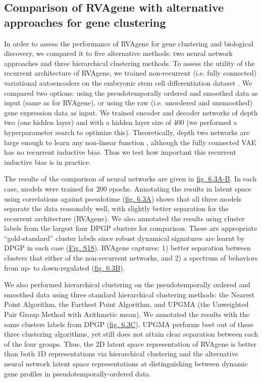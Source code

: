 \subsection{Comparison of RVAgene with alternative approaches for gene clustering}

In order to assess the performance of RVAgene for gene clustering and biological discovery, we compared it to five alternative methods: two neural network approaches and three hierarchical clustering methods. To assess the utility of the recurrent architecture of RVAgene, we trained non-recurrent (i.e. fully connected) variational autoencoders on the embryonic stem cell differentiation dataset \citep{Klein2015}. We compared two options: using the pseudotemporally ordered and smoothed data as input (same as for RVAgene), or using the raw (i.e. unordered and unsmoothed) gene expression data as input. We trained encoder and decoder networks of depth two (one hidden layer) and with a hidden layer size of 400 (we performed a hyperparameter search to optimize this). Theoretically, depth two networks are large enough to learn any non-linear function \citep{cybenko1989approximation, hornik1989multilayer, funahashi1989approximate, barron1994approximation}, although the fully connected VAE has no recurrent inductive bias. Thus we test how important this recurrent inductive bias is in practice. 
\par 
The results of the comparison of neural networks are given in \hyperref[fig:fig4]{fig. 6.3A-B}. In
each case, models were trained for 200 epochs. Annotating the results in latent space using
correlations against pseudotime (\hyperref[fig:fig4]{fig. 6.3A}) shows that all three models
separate the data reasonably well, with slightly better separation for the recurrent architecture
(RVAgene). We also annotated the results using cluster labels from the largest four DPGP clusters
for comparison. These are appropriate ``gold-standard'' cluster labels since robust dynamical
signatures are learnt by DPGP in each case (\hyperref[fig:figS3]{Fig. S18}). RVAgene captures: 1) better
separation between clusters that either of the non-recurrent networks, and 2) a spectrum of
behaviors from up- to down-regulated (\hyperref[fig:fig4]{fig. 6.3B}).
\par 
We also performed hierarchical clustering on the pseudotemporally ordered and smoothed data using
three standard hierarchical clustering methods: the Nearest Point Algorithm, the Farthest Point
Algorithm, and UPGMA (the Unweighted Pair Group Method with Arithmetic mean). We annotated the
results with the same clusters labels from DPGP (\hyperref[fig:fig4]{fig. 6.3C}). UPGMA performs best out of these three clustering algorithms, yet still does not attain clear separation between each of the four groups. Thus, the 2D latent space representation of RVAgene is better than both 1D representations via hierarchical clustering and the alternative neural network latent space representations at distinguishing between dynamic gene profiles in pseudotemporally-ordered data.



